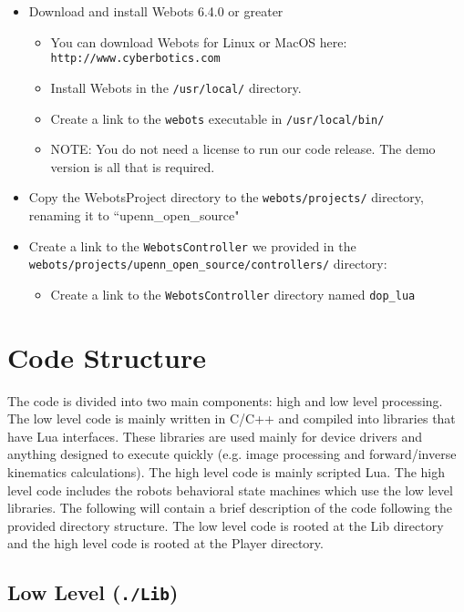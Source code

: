 \documentclass{article}
\begin{document}
    \begin{itemize}
      \item Download and install Webots 6.4.0 or greater
      \begin{itemize}
        \item You can download Webots for Linux or MacOS here: \\
          \texttt{http://www.cyberbotics.com}
        \item Install Webots in the \texttt{/usr/local/} directory. 
        \item Create a link to the \texttt{webots} executable in \texttt{/usr/local/bin/}
        \item NOTE: You do not need a license to run our code release. The demo version is all that is required.
      \end{itemize}
      \item Copy the WebotsProject directory to the \texttt{webots/projects/} directory, renaming it to ``upenn\_open\_source"
      \item Create a link to the \texttt{WebotsController} we provided in the \\
        \texttt{webots/projects/upenn\_open\_source/controllers/} directory:
      \begin{itemize}
        \item Create a link to the \texttt{WebotsController} directory named \texttt{dop\_lua}
      \end{itemize}
    \end{itemize}


\section{Code Structure}
  
  The code is divided into two main components: high and low level processing. The low level code is mainly written in C/C++ and compiled into libraries that have Lua interfaces. These libraries are used mainly for device drivers and anything designed to execute quickly (e.g. image processing and forward/inverse kinematics calculations). The high level code is mainly scripted Lua. The high level code includes the robots behavioral state machines which use the low level libraries.
  The following will contain a brief description of the code following the provided directory structure. The low level code is rooted at the Lib directory and the high level code is rooted at the Player directory.
  
  \subsection{Low Level (\texttt{./Lib})}
\end{document}
